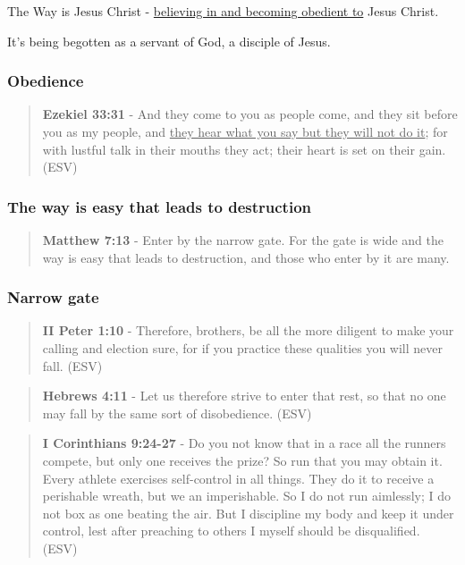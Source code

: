 \documentclass[11pt]{article}
\begin{document}
The Way is Jesus Christ - \uline{believing in and becoming obedient to} Jesus Christ.

It's being begotten as a servant of God, a disciple of Jesus.

\subsubsection{Obedience}
\label{sec:org49d3db3}
\begin{quote}
\textbf{Ezekiel 33:31} - And they come to you as people come, and they sit before you as my people, and \uline{they hear what you say but they will not do it}; for with lustful talk in their mouths they act; their heart is set on their gain. (ESV)
\end{quote}

\subsubsection{The way is easy that leads to destruction}
\label{sec:org2e65e13}
\begin{quote}
\textbf{Matthew 7:13} - Enter by the narrow gate. For the gate is wide and the way is easy that leads to destruction, and those who enter by it are many.
\end{quote}

\subsubsection{Narrow gate}
\label{sec:org3e410cb}
\begin{quote}
\textbf{II Peter 1:10} - Therefore, brothers, be all the more diligent to make your calling and election sure, for if you practice these qualities you will never fall. (ESV)
\end{quote}

\begin{quote}
\textbf{Hebrews 4:11} - Let us therefore strive to enter that rest, so that no one may fall by the same sort of disobedience. (ESV)
\end{quote}

\begin{quote}
\textbf{I Corinthians 9:24-27} - Do you not know that in a race all the runners compete, but only one receives the prize? So run that you may obtain it. Every athlete exercises self-control in all things. They do it to receive a perishable wreath, but we an imperishable. So I do not run aimlessly; I do not box as one beating the air. But I discipline my body and keep it under control, lest after preaching to others I myself should be disqualified. (ESV)
\end{quote}
\end{document}
